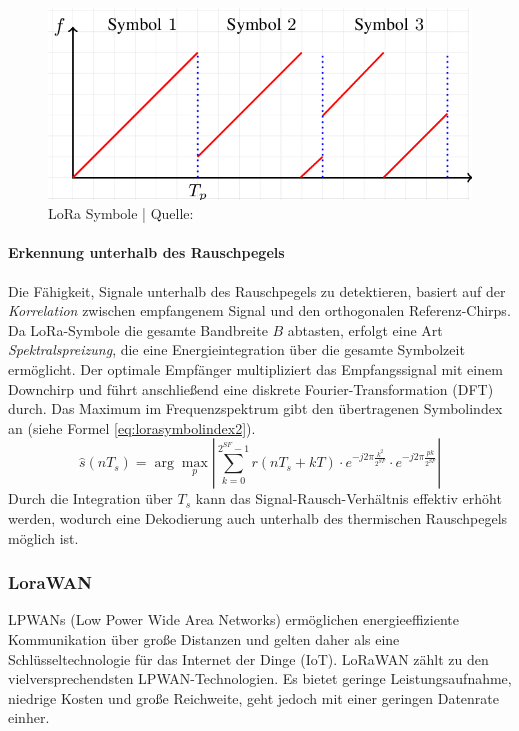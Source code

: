 \begin{figure}[H]
\centering
\includegraphics[scale=.4]{figures/asstes/n-LoRa-CSS-each-symbol-is-encoded-as-a-single-circularly-shifted-chirp-and-covers-the.png}
\caption{LoRa Symbole | Quelle: \cite{inproceedings}}
\label{fig:lora-symbole}
\end{figure}

\paragraph*{Erkennung unterhalb des Rauschpegels}
Die Fähigkeit, Signale unterhalb des Rauschpegels zu detektieren, basiert auf der \textit{Korrelation} zwischen empfangenem Signal und den orthogonalen Referenz-Chirps. Da LoRa-Symbole die gesamte Bandbreite $B$ abtasten, erfolgt eine Art \textit{Spektralspreizung}, die eine Energieintegration über die gesamte Symbolzeit ermöglicht. Der optimale Empfänger multipliziert das Empfangssignal mit einem Downchirp und führt anschließend eine diskrete Fourier-Transformation (DFT) durch. Das Maximum im Frequenzspektrum gibt den übertragenen Symbolindex an (siehe Formel \ref{eq:lorasymbolindex2}).
\begin{equation}
\label{eq:lorasymbolindex2}
\hat{s}(nT_s) = \arg \max_p \left| \sum_{k=0}^{2^{SF}-1} r(nT_s+kT) \cdot e^{-j 2\pi \frac{k^2}{2^{SF}}} \cdot e^{-j 2\pi \frac{p k}{2^{SF}}} \right|
\end{equation}
Durch die Integration über $T_s$ kann das Signal-Rausch-Verhältnis effektiv erhöht werden, wodurch eine Dekodierung auch unterhalb des thermischen Rauschpegels möglich ist. \autocite{tulkaLoRaSpreadingFactor, 8067462}


\subsubsection*{LoraWAN} 
\label{sec:lorawan}

LPWANs (Low Power Wide Area Networks) ermöglichen energieeffiziente Kommunikation über große Distanzen und gelten daher als eine Schlüsseltechnologie für das Internet der Dinge (IoT). LoRaWAN zählt zu den vielversprechendsten LPWAN-Technologien. Es bietet geringe Leistungsaufnahme, niedrige Kosten und große Reichweite, geht jedoch mit einer geringen Datenrate einher.

